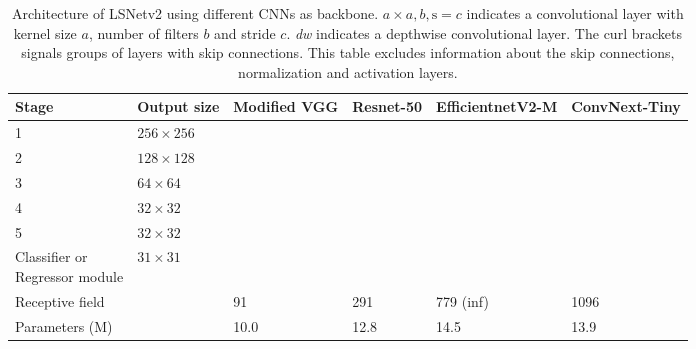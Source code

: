 \documentclass[journal]{IEEEtran}
\begin{document}
\begin{table}[]
\centering
\begin{tabular}{l|l|l|l|l|l}
Stage & Output size & Modified VGG & Resnet-50 & EfficientnetV2-M & ConvNext-Tiny \\ \hline
1     & $256 \times 256$   & \makecell{\vggone}      & \makecell{\resone}    & \makecell{\effone} &               \\ \hline
2     & $128 \times 128$   & \makecell{\vggtwo}      & \makecell{\restwo}  & \makecell{\efftwo}  & \makecell{\convnextone} \\ \hline
3     & $64 \times 64$     & \makecell{\vggthree}    & \makecell{\resthree}          & \makecell{\effthree} & \makecell{\convnexttwo}   \\ \hline
4     & $32 \times 32$     & \makecell{\vggfour}     & \makecell{\resfour}          & \makecell{\efffour}  & \makecell{\convnextthree}  \\ \hline
5     & $32 \times 32$     &              &           & \makecell{\efffive}  & \makecell{\convnextfour}   \\ \hline
\pbox{20cm}{Classifier or \\ Regressor module} & $31 \times 31$     & \multicolumn{4}{c}{\makecell{\branch}}                 \\ \hline
Receptive field     &              & 91         & 291          & 779 (inf)           & 1096                 \\ \hline
Parameters (M)      &              & 10.0       & 12.8          & 14.5           & 13.9 
\end{tabular}
\caption{\label{backbone_arch} Architecture of LSNetv2 using different CNNs as backbone. \textit{$ a \times a, b, \text{s}=c$} indicates a convolutional layer with kernel size $a$, number of filters $b$ and stride $c$. \textit{dw} indicates a depthwise convolutional layer. The curl brackets signals groups of layers with skip connections. This table excludes information about the skip connections, normalization and activation layers.}
\end{table}
\end{document}
